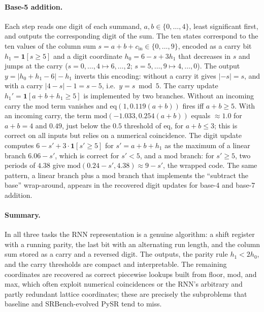 \documentclass[10pt]{article}
\newcommand{\op}[1]{\mathrm{#1}}
\begin{document}
\paragraph{Base-5 addition.}
Each step reads one digit of each summand, $a,b\in\{0,\ldots,4\}$, least significant first,
and outputs the corresponding digit of the sum. The ten states correspond to the ten values
of the column sum $s=a+b+c_{\mathrm{in}}\in\{0,\ldots,9\}$, encoded as a carry bit
$h_1=\mathbf 1[s\ge5]$ and a digit coordinate $h_0=6-s+3h_1$ that decreases in $s$ and jumps
at the carry ($s=0,\ldots,4\mapsto6,\ldots,2$; $s=5,\ldots,9\mapsto4,\ldots,0$). The output
$y=|h_0+h_1-6|-h_1$ inverts this encoding: without a carry it gives $|{-s}|=s$, and with a
carry $|4-s|-1=s-5$, i.e.\ $y=s\bmod5$. The carry update $h_1'=\mathbf 1[a+b+h_1\ge5]$ is
implemented by two branches. Without an incoming carry the mod term vanishes and
$\op{eq}(1,0.119(a+b))$ fires iff $a+b\ge5$. With an incoming carry, the term
$\op{mod}(-1.033,0.254(a+b))$ equals $\approx1.0$ for $a+b=4$ and $0.49$, just below the
$0.5$ threshold of $\op{eq}$, for $a+b\le3$; this is correct on all inputs but relies on a
numerical coincidence. The digit update computes $6-s'+3\cdot\mathbf 1[s'\ge5]$ for
$s'=a+b+h_1$ as the maximum of a linear branch $6.06-s'$, which is correct for $s'<5$, and a
mod branch: for $s'\ge5$, two periods of $4.38$ give $\op{mod}(0.24-s',4.38)\approx9-s'$, the
wrapped code. The same pattern, a linear branch plus a mod branch that implements the
``subtract the base'' wrap-around, appears in the recovered digit updates for base-4 and
base-7 addition.

\paragraph{Summary.}
In all three tasks the RNN representation is a genuine algorithm: a shift register with a
running parity, the last bit with an alternating run length, and the column sum stored as a
carry and a reversed digit. The outputs, the parity rule $h_1<2h_0$, and the carry thresholds
are compact and interpretable. The remaining coordinates are recovered as correct piecewise
lookups built from floor, mod, and max, which often exploit numerical coincidences or the
RNN's arbitrary and partly redundant lattice coordinates; these are precisely the
subproblems that baseline and SRBench-evolved PySR tend to miss.


\end{document}
